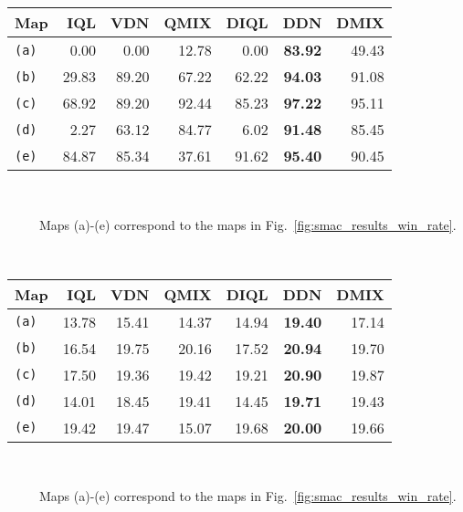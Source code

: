 \documentclass{article}
\begin{document}
 \begin{table*}[t]
\begin{minipage}{0.49\textwidth}
\footnotesize
\centering
\caption{The median win rate  of five independent test runs.}
\begin{tabular}{l|rrr|rrr}
\toprule
Map          & IQL   & VDN   & QMIX  & DIQL  & DDN            & DMIX \\
\midrule
\texttt{(a)} &  0.00 &  0.00 & 12.78 &  0.00 & \textbf{83.92} & 49.43 \\
\texttt{(b)} & 29.83 & 89.20 & 67.22 & 62.22 & \textbf{94.03} & 91.08 \\
\texttt{(c)} & 68.92 & 89.20 & 92.44 & 85.23 & \textbf{97.22} & 95.11 \\
\texttt{(d)} &  2.27 & 63.12 & 84.77 &  6.02 & \textbf{91.48} & 85.45 \\
\texttt{(e)} & 84.87 & 85.34 & 37.61 & 91.62 & \textbf{95.40} & 90.45 \\
\bottomrule
\end{tabular}
\label{table:smac_results_win_rate}
\small\\
\raggedright\ \ \ \ \textasteriskcentered\ Maps (a)-(e) correspond to the maps in Fig.~\ref{fig:smac_results_win_rate}.
\end{minipage}
~
\begin{minipage}{0.49\textwidth}
\small
\centering
\caption{The averaged scores of five independent test runs.}
\begin{tabular}{l|rrr|rrr}
\toprule
Map          & IQL   & VDN   & QMIX  & DIQL  & DDN            & DMIX \\
\midrule
\texttt{(a)} & 13.78 & 15.41 & 14.37 & 14.94 & \textbf{19.40} & 17.14 \\
\texttt{(b)} & 16.54 & 19.75 & 20.16 & 17.52 & \textbf{20.94} & 19.70 \\
\texttt{(c)} & 17.50 & 19.36 & 19.42 & 19.21 & \textbf{20.90} & 19.87 \\
\texttt{(d)} & 14.01 & 18.45 & 19.41 & 14.45 & \textbf{19.71} & 19.43 \\
\texttt{(e)} & 19.42 & 19.47 & 15.07 & 19.68 & \textbf{20.00} & 19.66 \\
\bottomrule
\end{tabular}
\label{table:smac_results_score}
\small\\
\raggedright\ \ \ \ \textasteriskcentered\ Maps (a)-(e) correspond to the maps in Fig.~\ref{fig:smac_results_win_rate}.
\end{minipage}
\end{table*}
 
\end{document}
